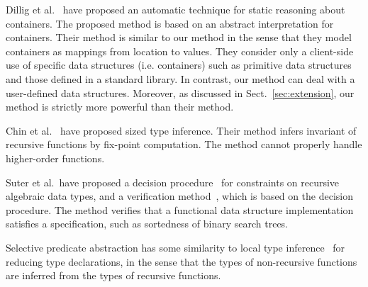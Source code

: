 Dillig et al.~\cite{Dillig2011} have proposed an automatic technique for
static reasoning about containers.  The proposed method is based on an
abstract interpretation for containers.  Their method is similar to our
method in the sense that they model containers as mappings from location
to values.  They consider only a client-side use of specific data
structures (i.e. containers) such as primitive data structures and those
defined in a standard library.  In contrast, our method can deal with a
user-defined data structures.  Moreover, as discussed in
Sect.~\ref{sec:extension}, our method is strictly more powerful than
their method.

Chin et al.~\cite{Chin2003} have proposed sized type inference.  Their
method infers invariant of recursive functions by fix-point computation.
The method cannot properly handle higher-order functions.

Suter et al.~have proposed a decision procedure~\cite{Suter2010} for
constraints on recursive algebraic data types, and a verification
method~\cite{Suter2011}, which is based on the
decision procedure.  The method verifies that a functional data
structure implementation satisfies a specification, such as sortedness
of binary search trees.

Selective predicate abstraction has some similarity to local type
inference~\cite{Pierce2000} for reducing type declarations, in the sense
that the types of non-recursive functions are inferred from the types of
recursive functions.
